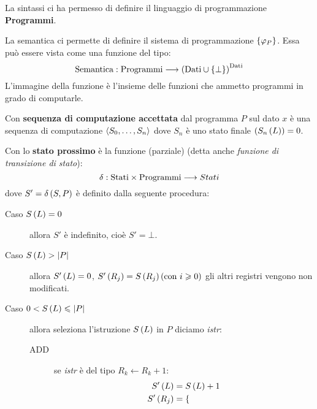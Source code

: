 \documentclass{lectures}
\begin{document}
\begin{multicols}{2}
\begin{definition}
\begin{enumerate}
        \end{enumerate}
    \end{definition}
    \begin{observation}
    La sintassi ci ha permesso di definire il linguaggio di programmazione \textbf{Programmi}.
\end{observation}
\begin{observation}
    La semantica ci permette di definire il sistema di programmazione \(\left\{\varphi_P\right\}\). Essa può essere vista come una funzione del tipo:
    \[
        \text{Semantica}:\text{Programmi}\longrightarrow \left(\text{Dati} \cup \left\{\bot\right\}\right)^{\text{Dati}}
    \]
    L'immagine della funzione è l'insieme delle funzioni che ammetto programmi in grado di computarle.
\end{observation}
    \begin{definition}
        Con \textbf{sequenza di computazione accettata} dal programma \(P\) sul dato \(x\) è una sequenza di computazione \(\left\langle S_0, \ldots, S_n\right\rangle\) dove \(S_n\) è uno stato finale \(\left(S_n\left(L\right)\right) = 0\).
    \end{definition}
    \begin{definition}
        Con lo \textbf{stato prossimo} è la funzione (parziale) (detta anche \textit{funzione di transizione di stato}):
        \[
            \delta:\text{Stati} \times \text{Programmi}\longrightarrow Stati
        \]
        dove \(S' = \delta\left(S,P\right)\) è definito dalla seguente procedura:
        \begin{description}
            \item[Caso \(S\left(L\right)=0\)] allora \(S'\) è indefinito, cioè \(S' = \bot\).
            \item[Caso \(S\left(L\right)>\left\lvert P\right\rvert\)] allora \(S'\left(L\right)=0\), \(S'\left(R_j\right) = S\left(R_j\right)\left(\text{con }i\geqslant 0\right)\) gli altri registri vengono non modificati.
            \item[Caso \(0 < S\left(L\right) \leqslant \left\lvert P\right\rvert\)] allora seleziona l'istruzione \(S\left(L\right)\) in \(P\) diciamo \textit{istr}:
                \begin{description}
                    \item[ADD] se \textit{istr} è del tipo \(R_k \leftarrow R_k + 1\):
                    \begin{align*}
                        S'\left(L\right) &= S\left(L\right) +1\\
                        S'\left(R_j\right) &= \begin{cases}

\end{cases}
\end{align*}
\end{description}
\end{description}
\end{definition}
\end{multicols}
\end{document}
